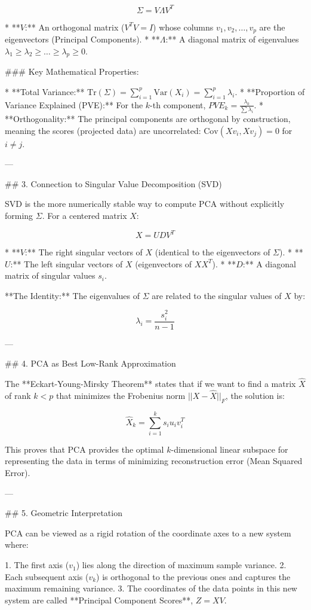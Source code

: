 $$\Sigma = V \Lambda V^T$$

* **$V$:** An orthogonal matrix ($V^T V = I$) whose columns $v_1, v_2, \dots, v_p$ are the eigenvectors (Principal Components).
* **$\Lambda$:** A diagonal matrix of eigenvalues $\lambda_1 \ge \lambda_2 \ge \dots \ge \lambda_p \ge 0$.

### Key Mathematical Properties:

* **Total Variance:** $\text{Tr}(\Sigma) = \sum_{i=1}^p \text{Var}(X_i) = \sum_{i=1}^p \lambda_i$.
* **Proportion of Variance Explained (PVE):** For the $k$-th component, $PVE_k = \frac{\lambda_k}{\sum \lambda_i}$.
* **Orthogonality:** The principal components are orthogonal by construction, meaning the scores (projected data) are uncorrelated: $\text{Cov}(Xv_i, Xv_j) = 0$ for $i \neq j$.

---

## 3. Connection to Singular Value Decomposition (SVD)

SVD is the more numerically stable way to compute PCA without explicitly forming $\Sigma$.
For a centered matrix $X$:


$$X = U D V^T$$

* **$V$:** The right singular vectors of $X$ (identical to the eigenvectors of $\Sigma$).
* **$U$:** The left singular vectors of $X$ (eigenvectors of $XX^T$).
* **$D$:** A diagonal matrix of singular values $s_i$.

**The Identity:** The eigenvalues of $\Sigma$ are related to the singular values of $X$ by:


$$\lambda_i = \frac{s_i^2}{n-1}$$

---

## 4. PCA as Best Low-Rank Approximation

The **Eckart-Young-Mirsky Theorem** states that if we want to find a matrix $\hat{X}$ of rank $k < p$ that minimizes the Frobenius norm $||X - \hat{X}||_F$, the solution is:


$$\hat{X}_k = \sum_{i=1}^k s_i u_i v_i^T$$


This proves that PCA provides the optimal $k$-dimensional linear subspace for representing the data in terms of minimizing reconstruction error (Mean Squared Error).

---

## 5. Geometric Interpretation

PCA can be viewed as a rigid rotation of the coordinate axes to a new system where:

1. The first axis ($v_1$) lies along the direction of maximum sample variance.
2. Each subsequent axis ($v_k$) is orthogonal to the previous ones and captures the maximum remaining variance.
3. The coordinates of the data points in this new system are called **Principal Component Scores**, $Z = XV$.

